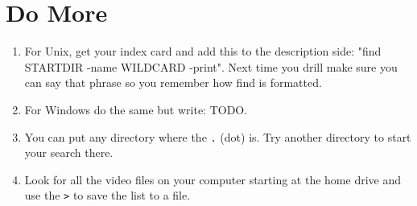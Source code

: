 \section{Do More}

\begin{enumerate}
\item For Unix, get your  index card and add this to the description side: "find STARTDIR -name WILDCARD -print".  Next time you drill make sure you can say that phrase so you remember how find is formatted.
\item For Windows do the same but write: TODO.
\item You can put any directory where the \verb|.| (dot) is.  Try another directory to start your search there.
\item Look for all the video files on your computer starting at the home drive and use the \verb|>| to save the list to a file.
\end{enumerate}

